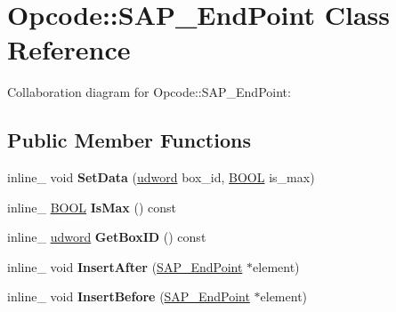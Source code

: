 \hypertarget{class_opcode_1_1_s_a_p___end_point}{\section{Opcode\+:\+:S\+A\+P\+\_\+\+End\+Point Class Reference}
\label{class_opcode_1_1_s_a_p___end_point}
}


Collaboration diagram for Opcode\+:\+:S\+A\+P\+\_\+\+End\+Point\+:
\subsection*{Public Member Functions}
\begin{DoxyCompactItemize}
\item 
\hypertarget{class_opcode_1_1_s_a_p___end_point_a90e0bfa83938766e1c69ff498ade3e1d}{inline\+\_\+ void {\bfseries Set\+Data} (\hyperlink{_ice_types_8h_a44c6f1920ba5551225fb534f9d1a1733}{udword} box\+\_\+id, \hyperlink{_ice_types_8h_a050c65e107f0c828f856a231f4b4e788}{B\+O\+O\+L} is\+\_\+max)}\label{class_opcode_1_1_s_a_p___end_point_a90e0bfa83938766e1c69ff498ade3e1d}

\item 
\hypertarget{class_opcode_1_1_s_a_p___end_point_af8ea9e9a39774491d07ad9186f0e792b}{inline\+\_\+ \hyperlink{_ice_types_8h_a050c65e107f0c828f856a231f4b4e788}{B\+O\+O\+L} {\bfseries Is\+Max} () const }\label{class_opcode_1_1_s_a_p___end_point_af8ea9e9a39774491d07ad9186f0e792b}

\item 
\hypertarget{class_opcode_1_1_s_a_p___end_point_a6bb9c12e143d0a3b39a6e6d6033c6330}{inline\+\_\+ \hyperlink{_ice_types_8h_a44c6f1920ba5551225fb534f9d1a1733}{udword} {\bfseries Get\+Box\+I\+D} () const }\label{class_opcode_1_1_s_a_p___end_point_a6bb9c12e143d0a3b39a6e6d6033c6330}

\item 
\hypertarget{class_opcode_1_1_s_a_p___end_point_a766544b335f5652a3a2c3049366ca5b9}{inline\+\_\+ void {\bfseries Insert\+After} (\hyperlink{class_opcode_1_1_s_a_p___end_point}{S\+A\+P\+\_\+\+End\+Point} $\ast$element)}\label{class_opcode_1_1_s_a_p___end_point_a766544b335f5652a3a2c3049366ca5b9}

\item 
\hypertarget{class_opcode_1_1_s_a_p___end_point_a6249ee4f220e7eb4d81829054537ffc0}{inline\+\_\+ void {\bfseries Insert\+Before} (\hyperlink{class_opcode_1_1_s_a_p___end_point}{S\+A\+P\+\_\+\+End\+Point} $\ast$element)}\label{class_opcode_1_1_s_a_p___end_point_a6249ee4f220e7eb4d81829054537ffc0}

\end{DoxyCompactItemize}
